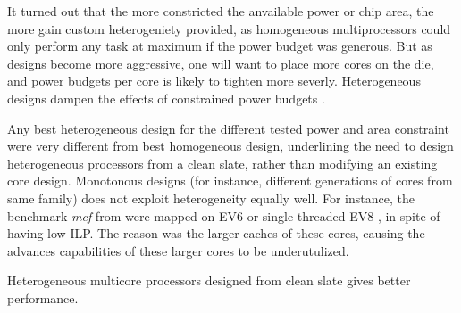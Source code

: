 It turned out that the more constricted the anvailable power or chip area, the more gain custom heterogeniety provided, as homogeneous multiprocessors could only perform any task at maximum if the power budget was generous.
But as designs become more aggressive, one will want to place more cores on the die, and power budgets per core is likely to tighten more severly.
Heterogeneous designs dampen the effects of constrained power budgets \cite{heterogeneous-arch}.

Any best heterogeneous design for the different tested power and area constraint were very different from best homogeneous design, underlining the need to design heterogeneous processors from a clean slate, rather than modifying an existing core design.
Monotonous designs (for instance, different generations of cores from same family) does not exploit heterogeneity equally well.
For instance, the benchmark \textit{mcf} from \cite{heterogeneous-ee} were mapped on EV6 or single-threaded EV8-, in spite of having low ILP.
The reason was the larger caches of these cores, causing the advances capabilities of these larger cores to be underutulized.

Heterogeneous multicore processors designed from clean slate gives better performance.




